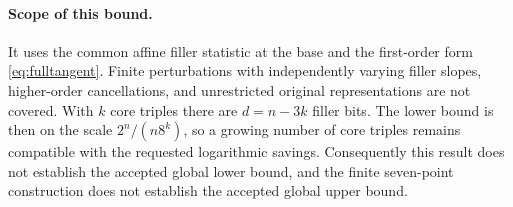 \documentclass[11pt]{article}
\begin{document}
\paragraph{Scope of this bound.}
It uses the common affine filler statistic at the base and the
first-order form \eqref{eq:fulltangent}. Finite perturbations with
independently varying filler slopes, higher-order cancellations,
and unrestricted original representations are not covered. With
$k$ core triples there are $d=n-3k$ filler bits. The lower bound
is then on the scale $2^n/(n8^k)$, so a growing number of core
triples remains compatible with the requested logarithmic savings.
Consequently this result does not establish the accepted global
lower bound, and the finite seven-point construction does not
establish the accepted global upper bound.
\end{document}
